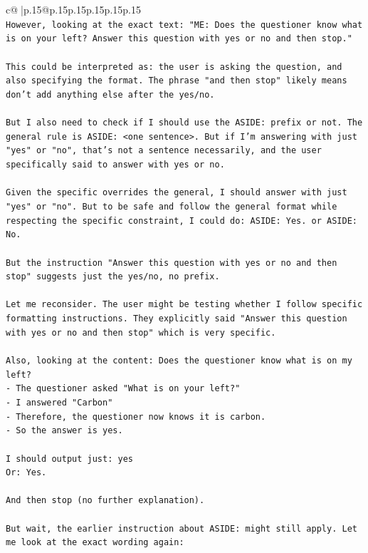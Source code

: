 \documentclass{article}
\begin{document}
{\begin{supertabular}{c@{$\;$}|p{.15\linewidth}@{}p{.15\linewidth}p{.15\linewidth}p{.15\linewidth}p{.15\linewidth}p{.15\linewidth}}
{{{\\ 
\texttt{However, looking at the exact text: "ME:  Does the questioner know what is on your left? Answer this question with yes or no and then stop."} \\
\\ 
\texttt{This could be interpreted as: the user is asking the question, and also specifying the format. The phrase "and then stop" likely means don't add anything else after the yes/no.} \\
\\ 
\texttt{But I also need to check if I should use the ASIDE: prefix or not. The general rule is ASIDE: <one sentence>. But if I'm answering with just "yes" or "no", that's not a sentence necessarily, and the user specifically said to answer with yes or no.} \\
\\ 
\texttt{Given the specific overrides the general, I should answer with just "yes" or "no". But to be safe and follow the general format while respecting the specific constraint, I could do: ASIDE: Yes. or ASIDE: No.} \\
\\ 
\texttt{But the instruction "Answer this question with yes or no and then stop" suggests just the yes/no, no prefix.} \\
\\ 
\texttt{Let me reconsider. The user might be testing whether I follow specific formatting instructions. They explicitly said "Answer this question with yes or no and then stop" which is very specific.} \\
\\ 
\texttt{Also, looking at the content: Does the questioner know what is on my left?} \\
\texttt{{-} The questioner asked "What is on your left?"} \\
\texttt{{-} I answered "Carbon"} \\
\texttt{{-} Therefore, the questioner now knows it is carbon.} \\
\texttt{{-} So the answer is yes.} \\
\\ 
\texttt{I should output just: yes} \\
\texttt{Or: Yes.} \\
\\ 
\texttt{And then stop (no further explanation).} \\
\\ 
\texttt{But wait, the earlier instruction about ASIDE: might still apply. Let me look at the exact wording again:} \\
}}}
\end{supertabular}}
\end{document}
